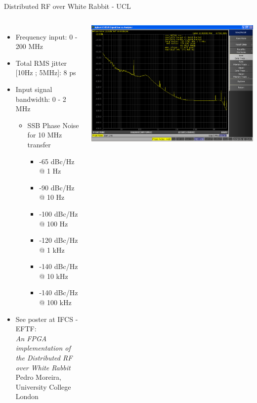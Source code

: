 \documentclass[compress,red]{beamer}
\begin{document}
\begin{frame}{Distributed RF over White Rabbit - UCL}
  \begin{columns}[c]
      \begin{itemize}
	\item Frequency input: 0 - 200 MHz
	\item Total RMS jitter [10Hz ; 5MHz]: 8 ps
	\item Input signal bandwidth: 0 - 2 MHz
	\begin{itemize}
	  \item SSB Phase Noise for 10 MHz transfer
	  \begin{itemize}
		\item    -65 dBc/Hz @ 1 Hz
		\item  -90 dBc/Hz @ 10 Hz
		\item -100 dBc/Hz @ 100 Hz
		\item -120 dBc/Hz @ 1 kHz
		\item  -140 dBc/Hz @ 10 kHz
		\item -140 dBc/Hz @ 100 kHz
	  \end{itemize}
	\end{itemize}
	\item  See poster at IFCS - EFTF: \\
		\emph{An FPGA implementation of the Distributed RF over White Rabbit} \\
		Pedro Moreira, University College London 
      \end{itemize}
      \begin{center}
	\includegraphics[width=1.0\textwidth]{applications/rx_10MHz_CsClock_pedro.png}

\end{center}
\end{columns}
\end{frame}
\end{document}
